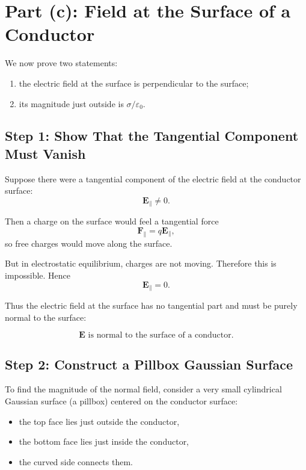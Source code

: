 \documentclass[hidelinks]{article}
\begin{document}
\section{Part (c): Field at the Surface of a Conductor}

We now prove two statements:

\begin{enumerate}
    \item the electric field at the surface is perpendicular to the surface;
    \item its magnitude just outside is $\sigma/\varepsilon_0$.
\end{enumerate}

\subsection{Step 1: Show That the Tangential Component Must Vanish}

Suppose there were a tangential component of the electric field at the conductor surface:
\[
\mathbf{E}_{\parallel}\neq 0.
\]

Then a charge on the surface would feel a tangential force
\[
\mathbf{F}_{\parallel}=q\mathbf{E}_{\parallel},
\]
so free charges would move along the surface.

But in electrostatic equilibrium, charges are not moving. Therefore this is impossible. Hence
\[
\boxed{\mathbf{E}_{\parallel}=0.}
\]

Thus the electric field at the surface has no tangential part and must be purely normal to the surface:

\[
\boxed{\mathbf{E} \text{ is normal to the surface of a conductor.}}
\]

\subsection{Step 2: Construct a Pillbox Gaussian Surface}

To find the magnitude of the normal field, consider a very small cylindrical Gaussian surface (a pillbox) centered on the conductor surface:

\begin{itemize}
    \item the top face lies just outside the conductor,
    \item the bottom face lies just inside the conductor,
    \item the curved side connects them.
\end{itemize}
\end{document}
